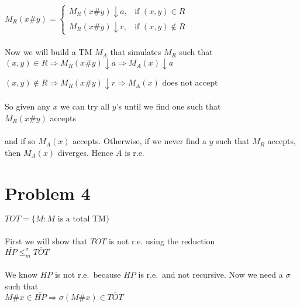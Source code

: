 \documentclass[12pt]{article}
\begin{document}
$M_R(x\#y) = \begin{cases} 
                M_R(x\#y) \downarrow a, & \mbox{if } (x,y) \in R\\
                M_R(x\#y) \downarrow r, & \mbox{if } (x,y) \notin R
            \end{cases}$\\
\\
Now we will build a TM $M_A$ that simulates $M_R$ such that\\

$(x,y) \in R \Rightarrow M_R(x\#y) \downarrow a \Rightarrow M_A(x) \downarrow a$

$(x,y) \notin R \Rightarrow M_R(x\#y) \downarrow r \Rightarrow M_A(x) \mbox{ does not accept}$\\
\\
So given any $x$ we can try all $y$'s until we find one such that\\

$M_R(x\#y)$ accepts\\
\\
and if so $M_A(x)$ accepts. Otherwise, if we never find a $y$ such that $M_R$ 
accepts, then $M_A(x)$ diverges. Hence $A$ is r.e.


\section*{Problem 4}
$TOT = \{M : M \mbox{ is a total TM} \}$\\
\\
First we will show that $\overline{TOT}$ is not r.e. using the reduction\\

$\overline{HP} \leqslant _m ^{\sigma} \overline{TOT}$\\
\\
We know $\overline{HP}$ is not r.e.\ because $HP$ is r.e.\ and not recursive. Now we
need a $\sigma$ such that\\

$M\#x \in \overline{HP} \Rightarrow \sigma(M\#x) \in \overline{TOT}$
\end{document}
